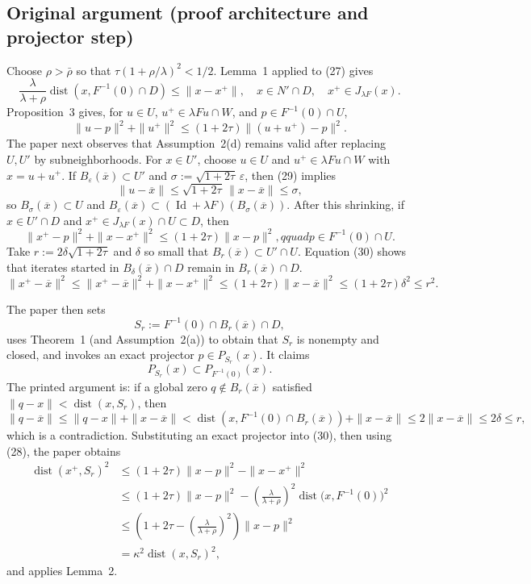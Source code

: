 \documentclass[11pt]{article}
\newcommand{\dist}{\operatorname{dist}}
\newcommand{\Id}{\operatorname{Id}}
\newcommand{\barx}{\overline{x}}
\begin{document}
\subsection*{Original argument (proof architecture and projector step)}

Choose \(\rho>\bar\rho\) so that \(\tau(1+\rho/\lambda)^2<1/2\). Lemma~1 applied to (27) gives
\begin{equation}
 \frac{\lambda}{\lambda+\rho}\dist(x,F^{-1}(0)\cap D)
 \le\|x-x^+\|,
 \quad x\in N'\cap D,\quad x^+\in J_{\lambda F}(x).       \tag{28}
\end{equation}
Proposition~3 gives, for \(u\in U\), \(u^+\in\lambda Fu\cap W\), and \(p\in F^{-1}(0)\cap U\),
\begin{equation}
 \|u-p\|^2+\|u^+\|^2
 \le(1+2\tau)\|(u+u^+)-p\|^2.                              \tag{29}
\end{equation}
The paper next observes that Assumption~2(d) remains valid after replacing \(U,U'\) by subneighborhoods. For \(x\in U'\), choose \(u\in U\) and \(u^+\in\lambda Fu\cap W\) with \(x=u+u^+\). If \(B_\varepsilon(\barx)\subset U'\) and \(\sigma:=\sqrt{1+2\tau}\,\varepsilon\), then (29) implies
\[
\|u-\barx\|\le\sqrt{1+2\tau}\,\|x-\barx\|\le\sigma,
\]
so \(B_\sigma(\barx)\subset U\) and \(B_\varepsilon(\barx)\subset(\Id+\lambda F)(B_\sigma(\barx))\). After this shrinking, if \(x\in U'\cap D\) and \(x^+\in J_{\lambda F}(x)\cap U\subset D\), then
\begin{equation}
 \|x^+-p\|^2+\|x-x^+\|^2
 \le(1+2\tau)\|x-p\|^2,qquad p\in F^{-1}(0)\cap U.       \tag{30}
\end{equation}
Take \(r:=2\delta\sqrt{1+2\tau}\) and \(\delta\) so small that \(B_r(\barx)\subset U'\cap U\). Equation (30) shows that iterates started in \(B_\delta(\barx)\cap D\) remain in \(B_r(\barx)\cap D\).
\[
\|x^+-\barx\|^2
\le\|x^+-\barx\|^2+\|x-x^+\|^2
\le(1+2\tau)\|x-\barx\|^2
\le(1+2\tau)\delta^2\le r^2.
\]

The paper then sets
\[
S_r:=F^{-1}(0)\cap B_r(\barx)\cap D,
\]
uses Theorem~1 (and Assumption~2(a)) to obtain that \(S_r\) is nonempty and closed, and invokes an exact projector \(p\in P_{S_r}(x)\). It claims
\begin{equation}
 P_{S_r}(x)\subset P_{F^{-1}(0)}(x).                               \tag{P}
\end{equation}
The printed argument is: if a global zero \(q\notin B_r(\barx)\) satisfied \(\|q-x\|<\dist(x,S_r)\), then
\[
 \|q-\barx\|\le\|q-x\|+\|x-\barx\|
 <\dist(x,F^{-1}(0)\cap B_r(\barx))+\|x-\barx\|
 \le2\|x-\barx\|\le2\delta\le r,
\]
which is a contradiction. Substituting an exact projector into (30), then using (28), the paper obtains
\[
\begin{aligned}
 \dist(x^+,S_r)^2
 &\le (1+2\tau)\|x-p\|^2-\|x-x^+\|^2\\
 &\le (1+2\tau)\|x-p\|^2
 -\left(\frac{\lambda}{\lambda+\rho}\right)^2
 \dist\bigl(x,F^{-1}(0)\bigr)^2\\
 &\le\left(1+2\tau-\left(\frac{\lambda}{\lambda+\rho}\right)^2\right)\|x-p\|^2\\
 &=\kappa^2\dist(x,S_r)^2,
\end{aligned}
\]
and applies Lemma~2.
\end{document}
